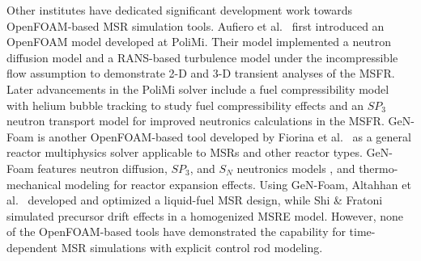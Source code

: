 Other institutes have dedicated significant development work towards
OpenFOAM-based \gls{MSR} simulation tools. Aufiero et al.\
\cite{aufiero_development_2014} first introduced an OpenFOAM model developed
at \gls{PoliMi}. Their model implemented a neutron diffusion model and a
\gls{RANS}-based turbulence model under the incompressible flow assumption to demonstrate 2-D
and 3-D transient analyses of the \gls{MSFR}. Later advancements in the
\gls{PoliMi} solver include a fuel compressibility model with helium bubble
tracking to study fuel compressibility effects
\cite{cervi_development_2019} and an $SP_3$ neutron transport
model for improved neutronics calculations \cite{cervi_development_2019-1} in
the \gls{MSFR}. GeN-Foam is another OpenFOAM-based tool developed by Fiorina
et al.\ \cite{fiorina_gen-foam_2015} as a general reactor multiphysics solver
applicable to \glspl{MSR} and other reactor types. GeN-Foam features neutron
diffusion, $SP_3$, and $S_N$ neutronics models
\cite{fiorina_development_2016,fiorina_gen-foam_2015,fiorina_detailed_2019},
and thermo-mechanical modeling for reactor expansion effects. Using GeN-Foam,
Altahhan et al.\ \cite{altahhan_preliminary_2020} developed and optimized a
liquid-fuel \gls{MSR} design, while Shi \& Fratoni \cite{shi_gen-foam_2021}
simulated precursor drift effects in a homogenized \gls{MSRE} model. However, none of the
OpenFOAM-based tools have demonstrated the capability for time-dependent \gls{MSR} simulations
with explicit control rod modeling.


